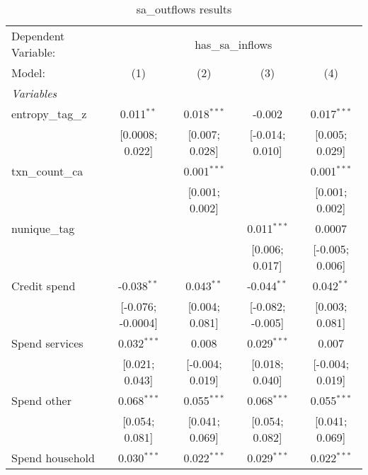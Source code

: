 
\begin{table}[htbp]
   \centering
   \scriptsize
   \begin{threeparttable}[b]
      \caption{\label{tab:reg_entropy_explore} sa\_outflows results}
      \begin{tabular}{lcccc}
         \tabularnewline \midrule \midrule
         Dependent Variable: & \multicolumn{4}{c}{has\_sa\_inflows}\\
         Model:                   & (1)               & (2)              & (3)              & (4)\\  
         \midrule
         \emph{Variables}\\
         entropy\_tag\_z          & 0.011$^{**}$      & 0.018$^{***}$    & -0.002           & 0.017$^{***}$\\   
                                  & [0.0008; 0.022]   & [0.007; 0.028]   & [-0.014; 0.010]  & [0.005; 0.029]\\   
         txn\_count\_ca           &                   & 0.001$^{***}$    &                  & 0.001$^{***}$\\   
                                  &                   & [0.001; 0.002]   &                  & [0.001; 0.002]\\   
         nunique\_tag             &                   &                  & 0.011$^{***}$    & 0.0007\\   
                                  &                   &                  & [0.006; 0.017]   & [-0.005; 0.006]\\   
         Credit spend             & -0.038$^{**}$     & 0.043$^{**}$     & -0.044$^{**}$    & 0.042$^{**}$\\   
                                  & [-0.076; -0.0004] & [0.004; 0.081]   & [-0.082; -0.005] & [0.003; 0.081]\\   
         Spend services           & 0.032$^{***}$     & 0.008            & 0.029$^{***}$    & 0.007\\   
                                  & [0.021; 0.043]    & [-0.004; 0.019]  & [0.018; 0.040]   & [-0.004; 0.019]\\   
         Spend other              & 0.068$^{***}$     & 0.055$^{***}$    & 0.068$^{***}$    & 0.055$^{***}$\\   
                                  & [0.054; 0.081]    & [0.041; 0.069]   & [0.054; 0.082]   & [0.041; 0.069]\\   
         Spend household          & 0.030$^{***}$     & 0.022$^{***}$    & 0.029$^{***}$    & 0.022$^{***}$\\   

\end{tabular}
\end{threeparttable}
\end{table}
